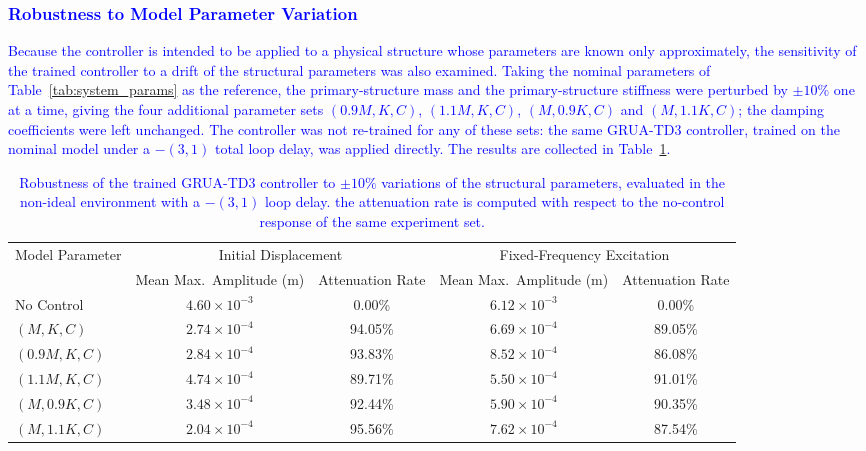 \documentclass[review]{elsarticle}
\begin{document}
\subsubsection{\textcolor{blue}{Robustness to Model Parameter Variation}}

\textcolor{blue}{Because the controller is intended to be applied to a physical structure whose parameters are known only approximately, the sensitivity of the trained controller to a drift of the structural parameters was also examined. Taking the nominal parameters of Table~\ref{tab:system_params} as the reference, the primary-structure mass and the primary-structure stiffness were perturbed by $\pm10\%$ one at a time, giving the four additional parameter sets $(0.9M,K,C)$, $(1.1M,K,C)$, $(M,0.9K,C)$ and $(M,1.1K,C)$; the damping coefficients were left unchanged. The controller was not re-trained for any of these sets: the same GRUA-TD3 controller, trained on the nominal model under a $-(3,1)$ total loop delay, was applied directly. The results are collected in Table~\ref{tab:robustness}.}

\begin{table}[htbp]
\color{blue}
\centering
\caption{\textcolor{blue}{Robustness of the trained GRUA-TD3 controller to $\pm10\%$ variations of the structural parameters, evaluated in the non-ideal environment with a $-(3,1)$ loop delay. the attenuation rate is computed with respect to the no-control response of the same experiment set.}}
\label{tab:robustness}
\small
\setlength{\tabcolsep}{4pt}
\begin{tabular}{lcccc} 
\toprule   
\multirow{2}{*}{Model Parameter} & \multicolumn{2}{c}{Initial Displacement} & \multicolumn{2}{c}{Fixed-Frequency Excitation} \\ \cline{2-5}
& Mean Max.\ Amplitude (m) & Attenuation Rate & Mean Max.\ Amplitude (m) & Attenuation Rate \\ \midrule
No Control        & $4.60\times10^{-3}$ & 0.00\%  & $6.12\times10^{-3}$ & 0.00\%  \\
$(M,K,C)$         & $2.74\times10^{-4}$ & 94.05\% & $6.69\times10^{-4}$ & 89.05\% \\
$(0.9M,K,C)$      & $2.84\times10^{-4}$ & 93.83\% & $8.52\times10^{-4}$ & 86.08\% \\
$(1.1M,K,C)$      & $4.74\times10^{-4}$ & 89.71\% & $5.50\times10^{-4}$ & 91.01\% \\
$(M,0.9K,C)$      & $3.48\times10^{-4}$ & 92.44\% & $5.90\times10^{-4}$ & 90.35\% \\
$(M,1.1K,C)$      & $2.04\times10^{-4}$ & 95.56\% & $7.62\times10^{-4}$ & 87.54\% \\
\bottomrule  
\end{tabular}
\end{table}
\end{document}
